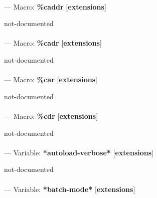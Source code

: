 \paragraph{}
\label{EXTENSIONS:CADDR}
--- Macro: \textbf{\%caddr} [\textbf{extensions}] \textit{}

\begin{adjustwidth}{5em}{5em}
not-documented
\end{adjustwidth}

\paragraph{}
\label{EXTENSIONS:CADR}
--- Macro: \textbf{\%cadr} [\textbf{extensions}] \textit{}

\begin{adjustwidth}{5em}{5em}
not-documented
\end{adjustwidth}

\paragraph{}
\label{EXTENSIONS:CAR}
--- Macro: \textbf{\%car} [\textbf{extensions}] \textit{}

\begin{adjustwidth}{5em}{5em}
not-documented
\end{adjustwidth}

\paragraph{}
\label{EXTENSIONS:CDR}
--- Macro: \textbf{\%cdr} [\textbf{extensions}] \textit{}

\begin{adjustwidth}{5em}{5em}
not-documented
\end{adjustwidth}

\paragraph{}
\label{EXTENSIONS:*AUTOLOAD-VERBOSE*}
--- Variable: \textbf{*autoload-verbose*} [\textbf{extensions}] \textit{}

\begin{adjustwidth}{5em}{5em}
not-documented
\end{adjustwidth}

\paragraph{}
\label{EXTENSIONS:*BATCH-MODE*}
--- Variable: \textbf{*batch-mode*} [\textbf{extensions}] \textit{}

